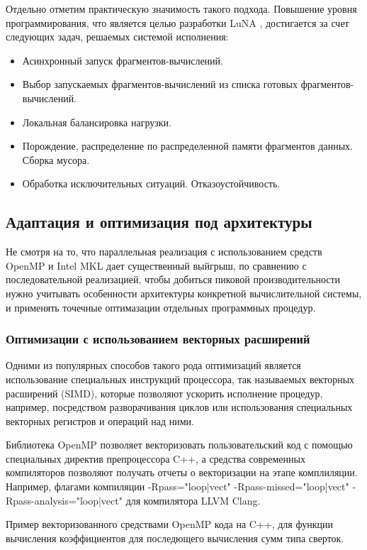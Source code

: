 Отдельно отметим практическую значимость такого подхода.
Повышение уровня программирования, что является целью разработки LuNA \cite{mach},
достигается за счет следующих задач, решаемых системой исполнения:
\begin{itemize}
    \item Асинхронный запуск фрагментов-вычислений.
    \item Выбор запускаемых фрагментов-вычислений из списка готовых фрагментов-вычислений.
    \item Локальная балансировка нагрузки.
    \item Порождение, распределение по распределенной памяти фрагментов данных.
Сборка мусора.
	\item Обработка исключительных ситуаций. Отказоустойчивость.
\end{itemize}

\subsection{Адаптация и оптимизация под архитектуры}
Не смотря на то, что параллельная реализация с использованием средств OpenMP и Intel MKL дает существенный выйгрыш,
по сравнению с последовательной реализацией, чтобы добиться пиковой производительности нужно учитывать особенности
архитектуры конкретной вычислительной системы, и применять точечные оптимазации отдельных программных процедур.

\subsubsection{Оптимизации с использованием векторных расширений}

Одними из популярных способов такого рода оптимизаций является использование специальных инструкций процессора,
так называемых векторных расширений (SIMD), которые позволяют ускорить исполнение процедур, например, посредством
разворачивания циклов или использования специальных векторных регистров и операций над ними.

Библиотека OpenMP позволяет векторизовать пользовательский код с помощью специальных директив препроцессора C++, а средства
современных компиляторов позволяют получать отчеты о векторизации на этапе комплиляции.
Например, флагами компиляции -Rpass="loop|vect" -Rpass-missed="loop|vect" -Rpass-analysis="loop|vect" для компилятора LLVM Clang.

Пример векторизованного средствами OpenMP кода на C++, для функции вычисления коэффициентов для последющего вычисления сумм типа сверток.

